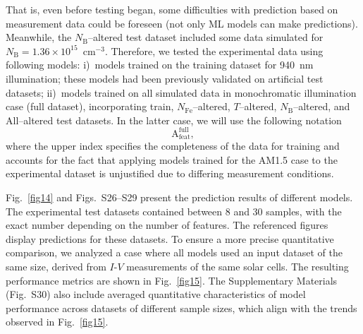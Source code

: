 \documentclass[a4paper,fleqn,draft]{cas-sc}
\begin{document}
That is, even before testing began, some difficulties with prediction based on measurement data could be foreseen (not only ML models can make predictions).
Meanwhile, the $N_\mathrm{B}$--altered test dataset included some data simulated for $N_\mathrm{B}=1.36\times10^{15}$~cm$^{-3}$.
Therefore, we tested the experimental data using following models:
i)~models trained on the training dataset for 940~nm illumination; these models had been previously validated on artificial test datasets;
ii)~models trained on all simulated data in monochromatic illumination case (full dataset), incorporating train, $N_\mathrm{Fe}$--altered,
$T$--altered, $N_\mathrm{B}$--altered, and All--altered test datasets.
In the latter case, we will use the following notation
\begin{equation*}
    \mathrm{A}^\mathrm{full}_\mathrm{feat},
\end{equation*}
where the upper index specifies the completeness of the data for training
and accounts for the fact that applying models trained for the AM1.5 case
to the experimental dataset is unjustified due to differing measurement conditions.

Fig.~\ref{fig14} and Figs.~S26--S29 present the prediction results of different models.
The experimental test datasets contained between 8 and 30 samples, with the exact number depending on the number of features.
The referenced figures display predictions for these datasets.
To ensure a more precise quantitative comparison, we analyzed a case where all models used an input dataset of the same size,
derived from $I$-$V$ measurements of the same solar cells.
The resulting performance metrics are shown in Fig.~\ref{fig15}.
The Supplementary Materials (Fig.~S30) also include averaged quantitative characteristics of model performance
across datasets of different sample sizes, which align with the trends observed in Fig.~\ref{fig15}.
\end{document}
